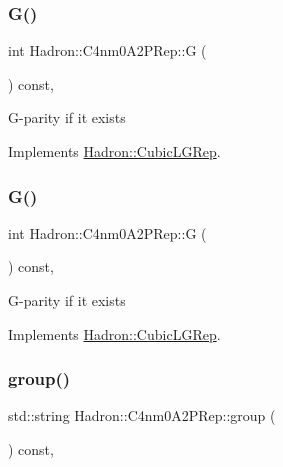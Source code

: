 \subsubsection{\texorpdfstring{G()}{G()}\hspace{0.1cm}{\footnotesize\ttfamily [2/3]}}
{\footnotesize\ttfamily int Hadron\+::\+C4nm0\+A2\+P\+Rep\+::G (\begin{DoxyParamCaption}{ }\end{DoxyParamCaption}) const\hspace{0.3cm}{\ttfamily [inline]}, {\ttfamily [virtual]}}

G-\/parity if it exists 

Implements \mbox{\hyperlink{structHadron_1_1CubicLGRep_ace26f7b2d55e3a668a14cb9026da5231}{Hadron\+::\+Cubic\+L\+G\+Rep}}.

\mbox{\label{structHadron_1_1C4nm0A2PRep_a8340077e9f3fea9b7b6421d3e9068d47}} 
\subsubsection{\texorpdfstring{G()}{G()}\hspace{0.1cm}{\footnotesize\ttfamily [3/3]}}
{\footnotesize\ttfamily int Hadron\+::\+C4nm0\+A2\+P\+Rep\+::G (\begin{DoxyParamCaption}{ }\end{DoxyParamCaption}) const\hspace{0.3cm}{\ttfamily [inline]}, {\ttfamily [virtual]}}

G-\/parity if it exists 

Implements \mbox{\hyperlink{structHadron_1_1CubicLGRep_ace26f7b2d55e3a668a14cb9026da5231}{Hadron\+::\+Cubic\+L\+G\+Rep}}.

\mbox{\label{structHadron_1_1C4nm0A2PRep_a37929ac674c03d89c04c8c8d34f88e02}} 
\subsubsection{\texorpdfstring{group()}{group()}\hspace{0.1cm}{\footnotesize\ttfamily [1/3]}}
{\footnotesize\ttfamily std\+::string Hadron\+::\+C4nm0\+A2\+P\+Rep\+::group (\begin{DoxyParamCaption}{ }\end{DoxyParamCaption}) const\hspace{0.3cm}{\ttfamily [inline]}, {\ttfamily [virtual]}}

